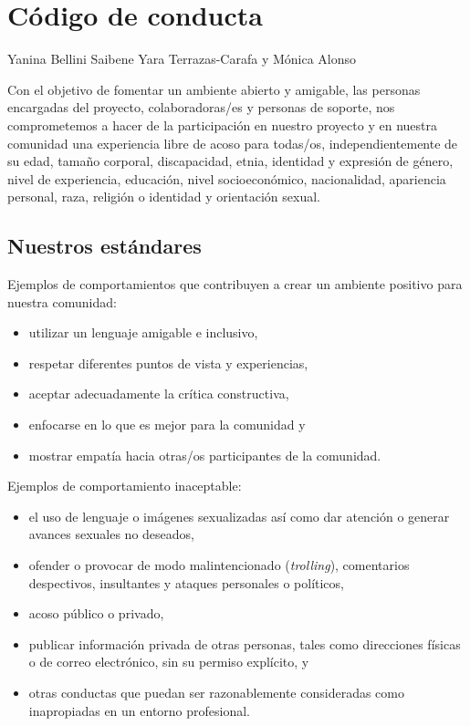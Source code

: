 \chapter{Código de conducta}\label{s:conduct} 

\begin{reveiwer}
{Yanina Bellini Saibene}
{Yara Terrazas-Carafa y	Mónica Alonso}
\end{reveiwer}

Con el objetivo de fomentar un ambiente abierto y amigable, 
las personas encargadas del proyecto, colaboradoras/es y personas de soporte, 
nos comprometemos a hacer de la participación en nuestro proyecto
y en nuestra comunidad una experiencia libre de acoso para todas/os,
independientemente de su edad, tamaño corporal, discapacidad, etnia,
identidad y expresión de género, nivel de experiencia, educación,
nivel socioeconómico, nacionalidad, apariencia personal, raza,
religión o identidad y orientación sexual.

\section*{Nuestros estándares}

Ejemplos de comportamientos que contribuyen a crear un ambiente positivo
para nuestra comunidad:

\begin{itemize}
\item
  utilizar un lenguaje amigable e inclusivo,
\item
  respetar diferentes puntos de vista y experiencias,
\item
  aceptar adecuadamente la crítica constructiva,
\item
 enfocarse en lo que es mejor para la comunidad y
\item
 mostrar empatía hacia otras/os participantes de la comunidad.
\end{itemize}

\noindent
Ejemplos de comportamiento inaceptable:

\begin{itemize}
\item
  el uso de lenguaje o imágenes sexualizadas así como  
  dar atención o generar avances sexuales no deseados,
\item
  ofender o provocar de modo malintencionado (\emph{trolling}), comentarios despectivos, insultantes y ataques personales o políticos,
\item
 acoso  público o privado,
\item
  publicar información privada de otras personas, tales como direcciones
  físicas o de correo electrónico, sin su permiso explícito, y
\item
  otras conductas que puedan ser razonablemente consideradas
  como inapropiadas en un entorno profesional.
\end{itemize}

